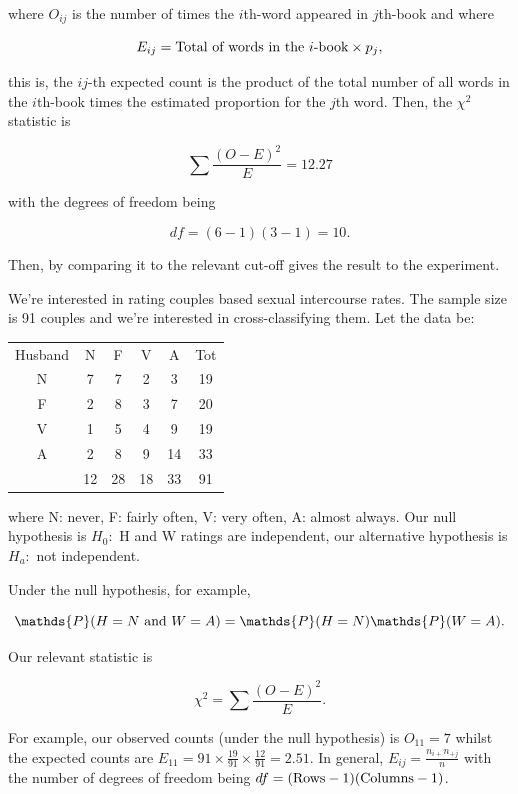 \documentclass{homework}
\begin{document}
\begin{tcolorbox}[title= Example 1 of Generalised Chi-squared Independence Testing]
where $O_{ij}$ is the number of times the $i$th-word appeared in $j$th-book and where 

$$
E_{ij} = {\textnormal{Total of words in the } i \textnormal{-book}} \times p_j,
$$

this is, the $ij$-th expected count is the product of the total number of all words in the $i$th-book times the estimated proportion for the $j$th word. Then, the $\chi^2$ statistic is 

$$
\sum \frac{(O-E)^2}{E} = 12.27
$$

with the degrees of freedom being 

$$
df = (6-1)(3-1) = 10.
$$

Then, by comparing it to the relevant cut-off gives the result to the experiment. 
\end{tcolorbox}

\begin{tcolorbox}[title= Example 2 of Generalised Chi-squared Independence Testing]

We're interested in rating couples based sexual intercourse rates. The sample size is 91 couples and we're interested in cross-classifying them. Let the data be:

\begin{center}
\begin{tabular}{ |c|c|c|c|c|c| } 
 \hline
 Husband & N & F & V & A & Tot \\
 N & 7 & 7 & 2 & 3 & 19\\ 
 F & 2 & 8 & 3 & 7 & 20 \\ 
 V & 1 & 5 & 4 & 9 & 19 \\
 A & 2 & 8 & 9 & 14 & 33 \\
 & 12 & 28 & 18 & 33 & 91
\end{tabular}
\end{center}

where N: never, F: fairly often, V: very often, A: almost always. Our null hypothesis is $H_0:$ H and W ratings are independent, our alternative hypothesis is $H_a: $ not independent. 

Under the null hypothesis, for example,

$$
\mathds{P}(H=N \textnormal{ and } W=A) = \mathds{P}(H=N) \mathds{P}(W=A).
$$

Our relevant statistic is 

$$
\chi^2 = \sum \frac{(O-E)^2}{E}.
$$

For example, our observed counts (under the null hypothesis) is $O_{11} = 7$ whilst the expected counts are $E_{11}= 91 \times \frac{19}{91}\times \frac{12}{91} = 2.51$. In general, $E_{ij} = \frac{n_{i+}n_{+j}}{n}$ with the number of degrees of freedom being $df = (\textnormal{Rows}-1)(\textnormal{Columns}-1)$.
\end{tcolorbox}
\end{document}
